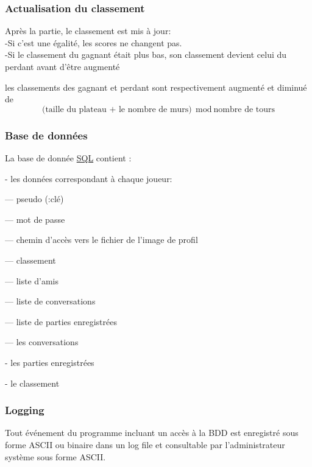 \documentclass[french, utf8]{article}
\begin{document}
\subsubsection{Actualisation du classement}
\label{sec:ActualisationDuClassement}

Après la partie, le classement est mis à jour:
\\-Si c'est une égalité, les scores ne changent pas.
\\-Si le classement du gagnant était plus bas,
son classement devient celui du perdant avant d'être augmenté

les classements des gagnant et perdant sont respectivement augmenté et diminué de \\
\[
 \text{(taille du plateau + le nombre de murs)} \mod \text{nombre de tours}
\]

\subsubsection{Base de données}
\label{sec:BaseDeDonnées}

La base de donnée \href{https://en.wikipedia.org/wiki/SQL}{SQL} contient :
\item- les données correspondant à chaque joueur:
\item--- pseudo (:clé)
\item--- mot de passe %
\item--- chemin d'accès vers le fichier de l'image de profil
\item--- classement
\item--- liste d'amis
\item--- liste de conversations
\item--- liste de parties enregistrées

\item--- les conversations
\item- les parties enregistrées
\item- le classement

\subsubsection{Logging}
\label{sec:Logging}
Tout événement du programme incluant un accès à la BDD est enregistré sous forme ASCII ou binaire dans un log file et consultable par l'administrateur système sous forme ASCII.
\end{document}
